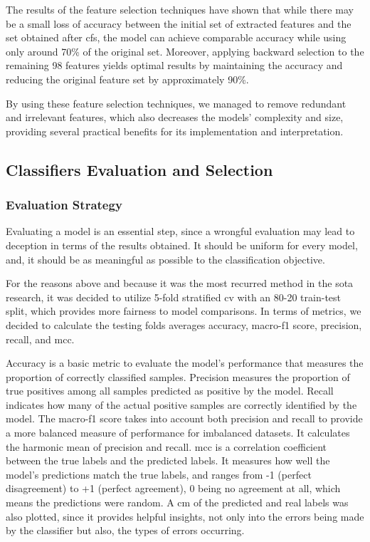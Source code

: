 The results of the feature selection techniques have shown that while there may be a small loss of accuracy between the initial set of extracted features and the set obtained after \ac{cfs}, the model can achieve comparable accuracy while using only around 70\% of the original set. Moreover, applying backward selection to the remaining 98 features yields optimal results by maintaining the accuracy and reducing the original feature set by approximately 90\%.

By using these feature selection techniques, we managed to remove redundant and irrelevant features, which also decreases the models' complexity and size, providing several practical benefits for its implementation and interpretation.


\subsection{Classifiers Evaluation and Selection}

\subsubsection{Evaluation Strategy}

Evaluating a model is an essential step, since a wrongful evaluation may lead to deception in terms of the results obtained. It should be uniform for every model, and, it should be as meaningful as possible to the classification objective.

For the reasons above and because it was the most recurred method in the \ac{sota} research, it was decided to utilize 5-fold stratified \ac{cv} with an 80-20 train-test split, which provides more fairness to model comparisons. In terms of metrics, we decided to calculate the testing folds averages accuracy, macro-f1 score, precision, recall, and \ac{mcc}.

Accuracy is a basic metric to evaluate the model's performance that measures the proportion of correctly classified samples. Precision measures the proportion of true positives among all samples predicted as positive by the model. Recall indicates how many of the actual positive samples are correctly identified by the model. The macro-f1 score takes into account both precision and recall to provide a more balanced measure of performance for imbalanced datasets. It calculates the harmonic mean of precision and recall. \ac{mcc} is a correlation coefficient between the true labels and the predicted labels. It measures how well the model's predictions match the true labels, and ranges from -1 (perfect disagreement) to +1 (perfect agreement), 0 being no agreement at all, which means the predictions were random. A \ac{cm} of the predicted and real labels was also plotted, since it provides helpful insights, not only into the errors being made by the classifier but also, the types of errors occurring.

